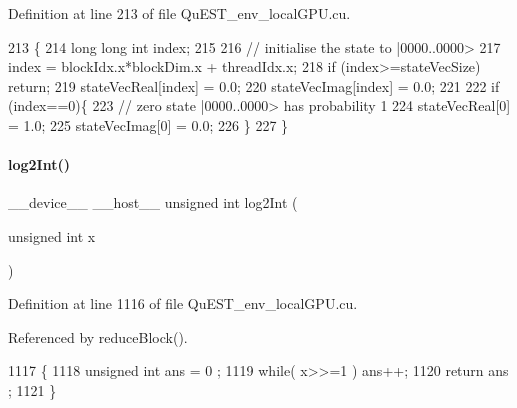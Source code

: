 Definition at line 213 of file Qu\+E\+S\+T\+\_\+env\+\_\+local\+G\+P\+U.\+cu.


\begin{DoxyCode}
213                                                                                                        \{
214     \textcolor{keywordtype}{long} \textcolor{keywordtype}{long} \textcolor{keywordtype}{int} index;
215 
216     \textcolor{comment}{// initialise the state to |0000..0000>}
217     index = blockIdx.x*blockDim.x + threadIdx.x;
218     \textcolor{keywordflow}{if} (index>=stateVecSize) \textcolor{keywordflow}{return};
219     stateVecReal[index] = 0.0;
220     stateVecImag[index] = 0.0;
221 
222     \textcolor{keywordflow}{if} (index==0)\{
223         \textcolor{comment}{// zero state |0000..0000> has probability 1}
224         stateVecReal[0] = 1.0;
225         stateVecImag[0] = 0.0;
226     \}
227 \}
\end{DoxyCode}
\mbox{\label{QuEST__env__localGPU_8cu_a8ce1e311ea72b862a8757dc71082fbf3}} 
\paragraph{\texorpdfstring{log2\+Int()}{log2Int()}}
{\footnotesize\ttfamily \+\_\+\+\_\+device\+\_\+\+\_\+ \+\_\+\+\_\+host\+\_\+\+\_\+ unsigned int log2\+Int (\begin{DoxyParamCaption}\item[{unsigned int}]{x }\end{DoxyParamCaption})}



Definition at line 1116 of file Qu\+E\+S\+T\+\_\+env\+\_\+local\+G\+P\+U.\+cu.



Referenced by reduce\+Block().


\begin{DoxyCode}
1117 \{
1118     \textcolor{keywordtype}{unsigned} \textcolor{keywordtype}{int} ans = 0 ;
1119     \textcolor{keywordflow}{while}( x>>=1 ) ans++;
1120     \textcolor{keywordflow}{return} ans ;
1121 \}
\end{DoxyCode}
\mbox{\label{QuEST__env__localGPU_8cu_ad5774247d836267175c664cd0e451bcb}} 
